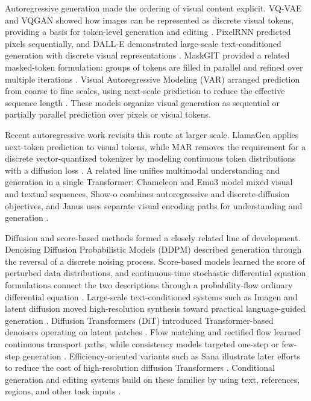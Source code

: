 Autoregressive generation made the ordering of visual content explicit. VQ-VAE and VQGAN showed how images can be represented as discrete visual tokens, providing a basis for token-level generation and editing \cite{oord2017vqvae,esser2021vqgan}. PixelRNN predicted pixels sequentially, and DALL-E demonstrated large-scale text-conditioned generation with discrete visual representations \cite{oord2016pixelrnn,ramesh2021dalle}. MaskGIT provided a related masked-token formulation: groups of tokens are filled in parallel and refined over multiple iterations \cite{chang2022maskgit}. Visual Autoregressive Modeling (VAR) arranged prediction from coarse to fine scales, using next-scale prediction to reduce the effective sequence length \cite{tian2024var}. These models organize visual generation as sequential or partially parallel prediction over pixels or visual tokens.

Recent autoregressive work revisits this route at larger scale. LlamaGen applies next-token prediction to visual tokens, while MAR removes the requirement for a discrete vector-quantized tokenizer by modeling continuous token distributions with a diffusion loss \cite{llamagen2024,mar2024}. A related line unifies multimodal understanding and generation in a single Transformer: Chameleon and Emu3 model mixed visual and textual sequences, Show-o combines autoregressive and discrete-diffusion objectives, and Janus uses separate visual encoding paths for understanding and generation \cite{chameleon2024,emu32024,showo2024,janus2024}.

Diffusion and score-based methods formed a closely related line of development. Denoising Diffusion Probabilistic Models (DDPM) described generation through the reversal of a discrete noising process. Score-based models learned the score of perturbed data distributions, and continuous-time stochastic differential equation formulations connect the two descriptions through a probability-flow ordinary differential equation \cite{ho2020ddpm,song2021scorebased}. Large-scale text-conditioned systems such as Imagen and latent diffusion moved high-resolution synthesis toward practical language-guided generation \cite{saharia2022imagen,rombach2022ldm}. Diffusion Transformers (DiT) introduced Transformer-based denoisers operating on latent patches \cite{peebles2023dit}. Flow matching and rectified flow learned continuous transport paths, while consistency models targeted one-step or few-step generation \cite{lipman2022flowmatching,liu2022rectified,song2023consistency}. Efficiency-oriented variants such as Sana illustrate later efforts to reduce the cost of high-resolution diffusion Transformers \cite{sana2024}. Conditional generation and editing systems build on these families by using text, references, regions, and other task inputs \cite{yang2025textimage,wang2025imageediting}.

